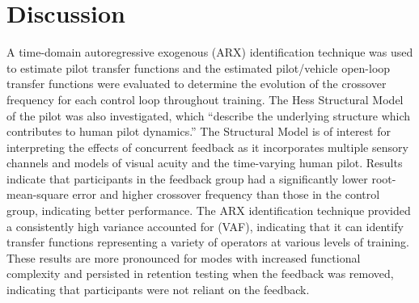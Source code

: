 \section{Discussion}

A time-domain autoregressive exogenous (ARX) identification technique was used to estimate pilot transfer functions and the estimated pilot/vehicle open-loop transfer functions were evaluated to determine the evolution of the crossover frequency for each control loop throughout training.
The Hess Structural Model of the pilot was also investigated, which ``describe the underlying structure which contributes to human pilot dynamics.''
The Structural Model is of interest for interpreting the effects of concurrent feedback as it incorporates multiple sensory channels and models of visual acuity and the time-varying human pilot.
Results indicate that participants in the feedback group had a significantly lower root-mean-square error and higher crossover frequency than those in the control group, indicating better performance.
The ARX identification technique provided a consistently high variance accounted for (VAF), indicating that it can identify transfer functions representing a variety of operators at various levels of training.
These results are more pronounced for modes with increased functional complexity and persisted in retention testing when the feedback was removed, indicating that participants were not reliant on the feedback.
